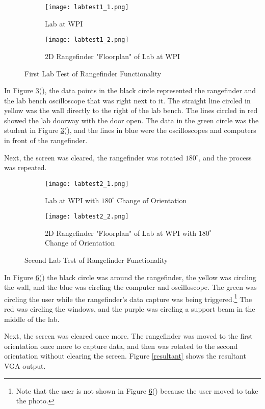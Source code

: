 \begin{figure}[H] 
	\begin{subfigure}{1\textwidth}
	\centering
		\texttt{[image: labtest1\_1.png]}
		\caption{Lab at WPI}
		\label{lab1}
	\end{subfigure}
	\begin{subfigure}{1\textwidth}
	\centering
		\texttt{[image: labtest1\_2.png]}
		\caption{2D Rangefinder "Floorplan" of Lab at WPI}
		\label{floorplan1}
	\end{subfigure}
	\caption{First Lab Test of Rangefinder Functionality}
	\label{labtest1}
\end{figure}

In Figure \ref{labtest1}(), the data points in the black circle represented the rangefinder and the lab bench oscilloscope that was right next to it. The straight line circled in yellow was the wall directly to the right of the lab bench. The lines circled in red showed the lab doorway with the door open. The data in the green circle was the student in Figure \ref{labtest1}(), and the lines in blue were the oscilloscopes and computers in front of the rangefinder.
\par
Next, the screen was cleared, the rangefinder was rotated $180^\circ$, and the process was repeated.

\begin{figure}[H] 
	\begin{subfigure}{1\textwidth}
	\centering
		\texttt{[image: labtest2\_1.png]}
		\caption{Lab at WPI with $180^\circ$ Change of Orientation}
		\label{lab2}
	\end{subfigure}
	\par
	\begin{subfigure}{1\textwidth}
	\centering
		\texttt{[image: labtest2\_2.png]}
		\caption{2D Rangefinder "Floorplan" of Lab at WPI with $180^\circ$ Change of Orientation}
		\label{floorplan2}
	\end{subfigure}
	\caption{Second Lab Test of Rangefinder Functionality}
	\label{labtest2}
\end{figure}

In Figure \ref{labtest2}() the black circle was around the rangefinder, the yellow was circling the wall, and the blue was circling the computer and oscilloscope. The green was circling the user while the rangefinder's data capture was being triggered.\footnote{ Note that the user is not shown in Figure \ref{labtest2}() because the user moved to take the photo.} The red was circling the windows, and the purple was circling a support beam in the middle of the lab.
\par
Next, the screen was cleared once more. The rangefinder was moved to the first orientation once more to capture data, and then was rotated to the second orientation without clearing the screen. Figure \ref{resultant} shows the resultant VGA output.

